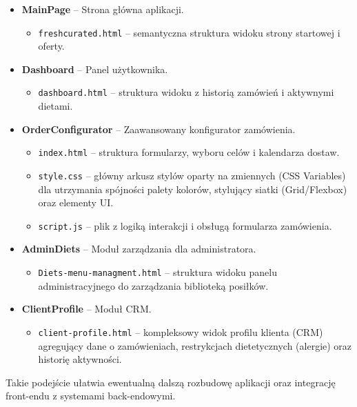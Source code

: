 \begin{itemize}
    \item \textbf{MainPage} -- Strona główna aplikacji.
    \begin{itemize}
        \item \texttt{freshcurated.html} -- semantyczna struktura widoku strony startowej i oferty.
    \end{itemize}
    
    \item \textbf{Dashboard} -- Panel użytkownika.
    \begin{itemize}
        \item \texttt{dashboard.html} -- struktura widoku z historią zamówień i aktywnymi dietami.
    \end{itemize}

    \item \textbf{OrderConfigurator} -- Zaawansowany konfigurator zamówienia.
    \begin{itemize}
        \item \texttt{index.html} -- struktura formularzy, wyboru celów i kalendarza dostaw.
        \item \texttt{style.css} -- główny arkusz stylów oparty na zmiennych (CSS Variables) dla utrzymania spójności palety kolorów, stylujący siatki (Grid/Flexbox) oraz elementy UI.
        \item \texttt{script.js} -- plik z logiką interakcji i obsługą formularza zamówienia.
    \end{itemize}

    \item \textbf{AdminDiets} -- Moduł zarządzania dla administratora.
    \begin{itemize}
        \item \texttt{Diets-menu-managment.html} -- struktura widoku panelu administracyjnego do zarządzania biblioteką posiłków.
    \end{itemize}

    \item \textbf{ClientProfile} -- Moduł CRM.
    \begin{itemize}
        \item \texttt{client-profile.html} -- kompleksowy widok profilu klienta (CRM) agregujący dane o zamówieniach, restrykcjach dietetycznych (alergie) oraz historię aktywności.
    \end{itemize}
\end{itemize}

Takie podejście ułatwia ewentualną dalszą rozbudowę aplikacji oraz integrację front-endu z systemami back-endowymi.
